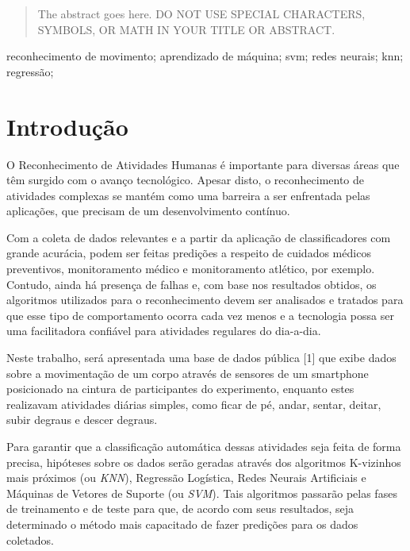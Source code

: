 \documentclass[10pt, conference, compsocconf]{IEEEtran}
\begin{document}
\begin{abstract}
The abstract goes here. DO NOT USE SPECIAL CHARACTERS, SYMBOLS, OR MATH IN YOUR TITLE OR ABSTRACT.

\end{abstract}

\begin{IEEEkeywords}
 reconhecimento de movimento; aprendizado de máquina; svm; redes neurais; knn;
regressão;
\end{IEEEkeywords}


%
\IEEEpeerreviewmaketitle



\section{Introdução}
O Reconhecimento de Atividades Humanas é importante para diversas áreas que têm surgido com o avanço tecnológico. Apesar disto, o reconhecimento de atividades complexas se mantém como uma barreira a ser enfrentada pelas aplicações, que precisam de um desenvolvimento contínuo.

Com a coleta de dados relevantes e a partir da aplicação de classificadores com
grande acurácia, podem ser feitas predições a respeito de cuidados médicos
preventivos, monitoramento médico e monitoramento atlético, por exemplo. Contudo, 
ainda há presença de falhas e, com base nos resultados obtidos, os algoritmos
utilizados para o reconhecimento devem ser analisados e tratados para que esse
tipo de comportamento ocorra cada vez menos e a tecnologia possa ser uma 
facilitadora confiável para atividades regulares do dia-a-dia.

Neste trabalho, será apresentada uma base de dados pública [1] que exibe dados 
sobre a movimentação de um corpo através de sensores de um smartphone posicionado 
na cintura de participantes do experimento, enquanto estes realizavam atividades 
diárias simples, como ficar de pé, andar, sentar, deitar, subir degraus e 
descer degraus. 

Para garantir que a classificação automática dessas atividades seja feita de
forma precisa, hipóteses sobre os dados serão geradas através dos algoritmos
K-vizinhos mais próximos (ou \textsl{KNN}), Regressão Logística, Redes Neurais 
Artificiais e Máquinas de Vetores de Suporte (ou \textsl{SVM}). Tais algoritmos 
passarão pelas fases de treinamento e de teste para que, de acordo com seus
resultados, seja determinado o método mais capacitado de fazer predições para 
os dados coletados.
\end{document}
